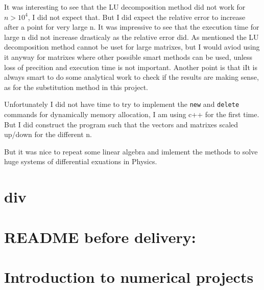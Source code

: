 \documentclass[11pt,a4wide]{article}
\begin{document}
It was interesting to see that the LU decomposition method did not work for $n>10^4$, I did not expect that. But I did expect the relative error to increase after a point for very large n. It was impressive to see that the execution time for large n did not increase drasticaly as the relative error did. As mentioned the LU decomposition method cannot be uset for large matrixes, but I would aviod using it anyway for matrixes where other possible smart methods can be used, unless loss of precition and execution time is not important. Another point is that iIt is always smart to do some analytical work to check if the results are making sense, as for the substitution method in this project. 

Unfortunately I did not have time to try to implement the \texttt{new} and \texttt{delete} commands for dynamically memory allocation, I am using c++ for the first time. But I did construct the program such that the vectors and matrixes scaled up/down for the different n. 

But it was nice to repeat some linear algebra and imlement the methods to solve huge systems of differential exuations in Physics.

\section{div}








\newpage
\section*{ README before delivery:}

\section*{Introduction to numerical projects}
\end{document}
